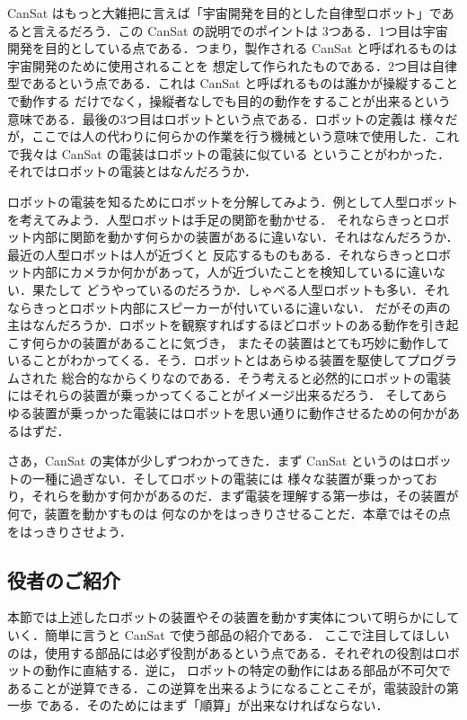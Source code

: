 \documentclass[dvipdfmx]{jsarticle}
\begin{document}
CanSat はもっと大雑把に言えば「宇宙開発を目的とした自律型ロボット」であると言えるだろう．この CanSat の説明でのポイントは
3つある．1つ目は宇宙開発を目的としている点である．つまり，製作される CanSat と呼ばれるものは宇宙開発のために使用されることを
想定して作られたものである．2つ目は自律型であるという点である．これは CanSat と呼ばれるものは誰かが操縦することで動作する
だけでなく，操縦者なしでも目的の動作をすることが出来るという意味である．最後の3つ目はロボットという点である．ロボットの定義は
様々だが，ここでは人の代わりに何らかの作業を行う機械という意味で使用した．これで我々は CanSat の電装はロボットの電装に似ている
ということがわかった．それではロボットの電装とはなんだろうか．

ロボットの電装を知るためにロボットを分解してみよう．例として人型ロボットを考えてみよう．人型ロボットは手足の関節を動かせる．
それならきっとロボット内部に関節を動かす何らかの装置があるに違いない．それはなんだろうか．最近の人型ロボットは人が近づくと
反応するものもある．それならきっとロボット内部にカメラか何かがあって，人が近づいたことを検知しているに違いない．果たして
どうやっているのだろうか．しゃべる人型ロボットも多い．それならきっとロボット内部にスピーカーが付いているに違いない．
だがその声の主はなんだろうか．ロボットを観察すればするほどロボットのある動作を引き起こす何らかの装置があることに気づき，
またその装置はとても巧妙に動作していることがわかってくる．そう．ロボットとはあらゆる装置を駆使してプログラムされた
総合的なからくりなのである．そう考えると必然的にロボットの電装にはそれらの装置が乗っかってくることがイメージ出来るだろう．
そしてあらゆる装置が乗っかった電装にはロボットを思い通りに動作させるための何かがあるはずだ．

さあ，CanSat の実体が少しずつわかってきた．まず CanSat というのはロボットの一種に過ぎない．そしてロボットの電装には
様々な装置が乗っかっており，それらを動かす何かがあるのだ．まず電装を理解する第一歩は，その装置が何で，装置を動かすものは
何なのかをはっきりさせることだ．本章ではその点をはっきりさせよう．

\subsection{役者のご紹介}

本節では上述したロボットの装置やその装置を動かす実体について明らかにしていく．簡単に言うと CanSat で使う部品の紹介である．
ここで注目してほしいのは，使用する部品には必ず役割があるという点である．それぞれの役割はロボットの動作に直結する．逆に，
ロボットの特定の動作にはある部品が不可欠であることが逆算できる．この逆算を出来るようになることこそが，電装設計の第一歩
である．そのためにはまず「順算」が出来なければならない．
\end{document}

